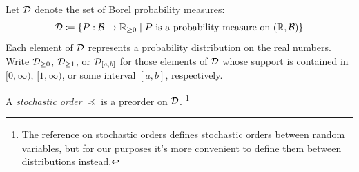 \documentclass[a4paper]{scrreprt}
\newcommand{\Rp}{\mathbb{R}_{\geq 0}}
\newcommand{\B}{\mathcal{B}}
\begin{document}
    Let $\mathcal{D}$ denote the set of Borel probability measures:
    \[ \DP \coloneqq \set{P: \B \to \Rp \mid P \text{ is a probability measure on } (\R, \B)} \]
    Each element of $\mathcal{D}$ represents a probability distribution on the real numbers.
    Write $\mathcal{D}_{\geq0}$, $\mathcal{D}_{\geq1}$, or $\mathcal{D}_{[a, b]}$ for those elements of $\mathcal{D}$ whose support is contained in $[0, \infty)$, $[1, \infty)$, or some interval $[a, b]$, respectively.
    
    \let\dleq\preccurlyeq
    \let\dgeq\succcurlyeq
    \let\dless\prec
    \let\dgreater\succ
    
    \newcommand{\leqE}{\dleq_E}
    \newcommand{\leqst}{\dleq_{\text{st}}}
    \newcommand{\leqtail}{\dleq_{\text{tail}}}
    \newcommand{\lesstail}{\dless_{\text{tail}}}
    \newcommand{\greatertail}{\dgreater_{\text{tail}}}
    \newcommand{\leqRlex}{\leq_{\textsc{Rlex}}}
    \newcommand{\lessRlex}{<_{\textsc{Rlex}}}
    \newcommand{\geqRlex}{\geq_{\textsc{Rlex}}}
    \newcommand{\greaterRlex}{>_{\textsc{Rlex}}}
    \newcommand{\leqtw}[1][]{\dleq_{\text{\tiny tw,$\scriptscriptstyle\ifstrempty{#1}{\mathcal{I}}{#1}$}}}
    \newcommand{\geqtw}[1][]{\dgeq_{\text{\tiny tw,$\scriptscriptstyle\ifstrempty{#1}{\mathcal{I}}{#1}$}}}
    \newcommand{\lesstw}[1][]{\dless_{\text{\tiny tw,$\scriptscriptstyle\ifstrempty{#1}{\mathcal{I}}{#1}$}}}
    \newcommand{\greatertw}[1][]{\dgreater_{\text{\tiny tw,$\scriptscriptstyle\ifstrempty{#1}{\mathcal{I}}{#1}$}}}
    \newcommand{\leqpareto}{\leq_{\text{par}}}
    \newcommand{\geqpareto}{\geq_{\text{par}}}
    \newcommand{\lesspareto}{<_{\text{par}}}
    \newcommand{\greaterpareto}{>_{\text{par}}}
    \newcommand{\indiffpareto}{\sim_{\text{par}}}
    \newcommand{\leqdom}{\leq_{\text{dom}}}
    \newcommand{\geqdom}{\geq_{\text{dom}}}
    \newcommand{\lessdom}{<_{\text{dom}}}
    \newcommand{\greaterdom}{>_{\text{dom}}}
    
    \begin{defn}
        A \emph{stochastic order} $\dleq$ is a preorder on $\mathcal{D}$.
        \footnote{The reference on stochastic orders \cite{bib:shakedStochasticOrders} defines stochastic orders between random variables, but for our purposes it's more convenient to define them between distributions instead.}
    \end{defn}
    
\end{document}
